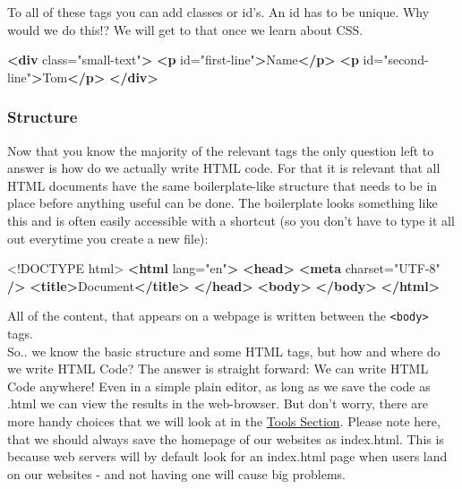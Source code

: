 \documentclass[
]{article}
\newenvironment{Shaded}{\begin{snugshade}}{\end{snugshade}}
\newcommand{\DataTypeTok}[1]{\textcolor[rgb]{0.13,0.29,0.53}{#1}}
\newcommand{\KeywordTok}[1]{\textcolor[rgb]{0.13,0.29,0.53}{\textbf{#1}}}
\newcommand{\NormalTok}[1]{#1}
\newcommand{\OtherTok}[1]{\textcolor[rgb]{0.56,0.35,0.01}{#1}}
\newcommand{\StringTok}[1]{\textcolor[rgb]{0.31,0.60,0.02}{#1}}
\begin{document}
To all of these tags you can add classes or id's. An id has to be unique. Why would we do this!? We will get to that once we learn about CSS.

\begin{Shaded}
\begin{Highlighting}[]
\KeywordTok{\textless{}div}\OtherTok{ class=}\StringTok{"small{-}text"}\KeywordTok{\textgreater{}}
  \KeywordTok{\textless{}p}\OtherTok{ id=}\StringTok{"first{-}line"}\KeywordTok{\textgreater{}}\NormalTok{Name}\KeywordTok{\textless{}/p\textgreater{}}
  \KeywordTok{\textless{}p}\OtherTok{ id=}\StringTok{"second{-}line"}\KeywordTok{\textgreater{}}\NormalTok{Tom}\KeywordTok{\textless{}/p\textgreater{}}
\KeywordTok{\textless{}/div\textgreater{}}
\end{Highlighting}
\end{Shaded}

\hypertarget{structure}{%
\subsubsection*{Structure}\label{structure}}

Now that you know the majority of the relevant tags the only question left to answer is how do we actually write HTML code. For that it is relevant that all HTML documents have the same boilerplate-like structure that needs to be in place before anything useful can be done. The boilerplate looks something like this and is often easily accessible with a shortcut (so you don't have to type it all out everytime you create a new file):

\begin{Shaded}
\begin{Highlighting}[]
\DataTypeTok{\textless{}!DOCTYPE }\NormalTok{html}\DataTypeTok{\textgreater{}}
\KeywordTok{\textless{}html}\OtherTok{ lang=}\StringTok{"en"}\KeywordTok{\textgreater{}}
  \KeywordTok{\textless{}head\textgreater{}}
    \KeywordTok{\textless{}meta}\OtherTok{ charset=}\StringTok{"UTF{-}8"} \KeywordTok{/\textgreater{}}
    \KeywordTok{\textless{}title\textgreater{}}\NormalTok{Document}\KeywordTok{\textless{}/title\textgreater{}}
  \KeywordTok{\textless{}/head\textgreater{}}
  \KeywordTok{\textless{}body\textgreater{}}
  \KeywordTok{\textless{}/body\textgreater{}}
\KeywordTok{\textless{}/html\textgreater{}}
\end{Highlighting}
\end{Shaded}

All of the content, that appears on a webpage is written between the \texttt{\textless{}body\textgreater{}} tags.\\
So.. we know the basic structure and some HTML tags, but how and where do we write HTML Code? The answer is straight forward: We can write HTML Code anywhere! Even in a simple plain editor, as long as we save the code as .html we can view the results in the web-browser. But don't worry, there are more handy choices that we will look at in the \protect\hyperlink{tools}{Tools Section}. Please note here, that we should always save the homepage of our websites as index.html. This is because web servers will by default look for an index.html page when users land on our websites - and not having one will cause big problems.
\end{document}
